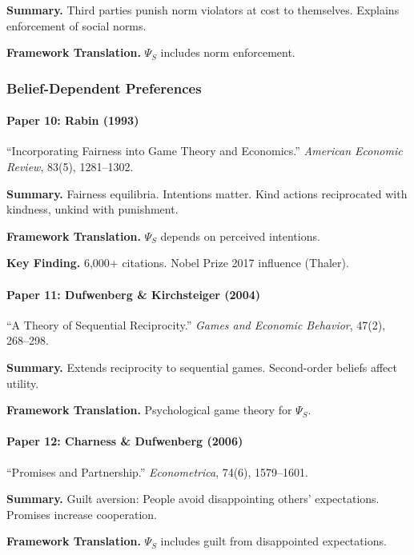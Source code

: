 \textbf{Summary.}
Third parties punish norm violators at cost to themselves.
Explains enforcement of social norms.

\textbf{Framework Translation.}
$\Psi_S$ includes norm enforcement.

\subsubsection{Belief-Dependent Preferences}

\paragraph{Paper 10: Rabin (1993)}

``Incorporating Fairness into Game Theory and Economics.''
\textit{American Economic Review}, 83(5), 1281--1302.

\textbf{Summary.}
Fairness equilibria. Intentions matter. Kind actions reciprocated 
with kindness, unkind with punishment.

\textbf{Framework Translation.}
$\Psi_S$ depends on perceived intentions.

\textbf{Key Finding.}
6,000+ citations. Nobel Prize 2017 influence (Thaler).

\paragraph{Paper 11: Dufwenberg \& Kirchsteiger (2004)}

``A Theory of Sequential Reciprocity.''
\textit{Games and Economic Behavior}, 47(2), 268--298.

\textbf{Summary.}
Extends reciprocity to sequential games. Second-order beliefs 
affect utility.

\textbf{Framework Translation.}
Psychological game theory for $\Psi_S$.

\paragraph{Paper 12: Charness \& Dufwenberg (2006)}

``Promises and Partnership.''
\textit{Econometrica}, 74(6), 1579--1601.

\textbf{Summary.}
Guilt aversion: People avoid disappointing others' expectations.
Promises increase cooperation.

\textbf{Framework Translation.}
$\Psi_S$ includes guilt from disappointed expectations.

